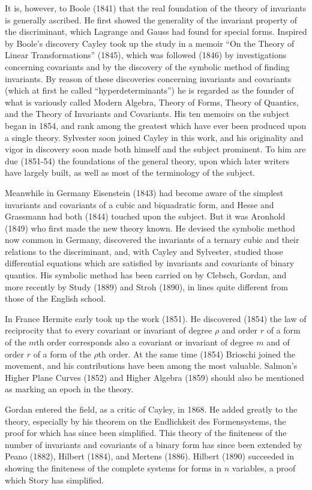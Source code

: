 \documentclass[oneside]{book}
\begin{document}
{It is, however, to Boole (1841) that the real foundation of the
theory of invariants is generally ascribed. He first showed the
generality of the invariant property of the discriminant, which
Lagrange and Gauss had found for special forms. Inspired by Boole's
discovery Cayley took up the study in a memoir ``On the Theory of
Linear Transformations'' (1845), which was followed (1846) by
investigations concerning covariants and by the discovery of the
symbolic method of finding invariants. By reason of these
discoveries concerning invariants and covariants (which at first he
called ``hyperdeterminants'') he is regarded as the founder of what
is variously called Modern Algebra, Theory of Forms, Theory of
Quantics, and the Theory of Invariants and Covariants. His ten
memoirs on the subject began in 1854, and rank among the greatest
which have ever been produced upon a single theory. Sylvester soon
joined Cayley in this work, and his originality and vigor in
discovery soon made both himself and the subject prominent. To him
are due (1851-54) the foundations of the general theory, upon which
later writers have largely built, as well as most of the terminology
of the subject.

Meanwhile in Germany Eisenstein (1843) had become aware of the
simplest invariants and covariants of a cubic and biquadratic form,
and Hesse and Grassmann had both (1844) touched upon the
subject. But it was Aronhold (1849) who first made the new theory
known. He devised the symbolic method now common in Germany,
discovered the invariants of a ternary cubic and their relations to
the discriminant, and, with Cayley and Sylvester, studied those
differential equations which are satisfied by invariants and
covariants of binary quantics. His symbolic method has been carried
on by Clebsch, Gordan, and more recently by Study (1889) and Stroh
(1890), in lines quite different from those of the English school.

In France Hermite early took up the work (1851). He discovered
(1854) the law of reciprocity that to every covariant or invariant
of degree $\rho$ and order $r$ of a form of the $m$th order
corresponds also a covariant or invariant of degree $m$ and of order
$r$ of a form of the $\rho$th order. At the same time (1854)
Brioschi joined the movement, and his contributions have been among
the most valuable. Salmon's Higher Plane Curves (1852) and Higher
Algebra (1859) should also be mentioned as marking an epoch in the
theory.

Gordan entered the field, as a critic of Cayley, in 1868. He added
greatly to the theory, especially by his theorem on the Endlichkeit
des Formensystems, the proof for which has since been
simplified. This theory of the finiteness of the number of
invariants and covariants of a binary form has since been extended
by Peano (1882), Hilbert (1884), and Mertens (1886). Hilbert (1890)
succeeded in showing the finiteness of the complete systems for
forms in $n$ variables, a proof which Story has simplified.

}
\end{document}
